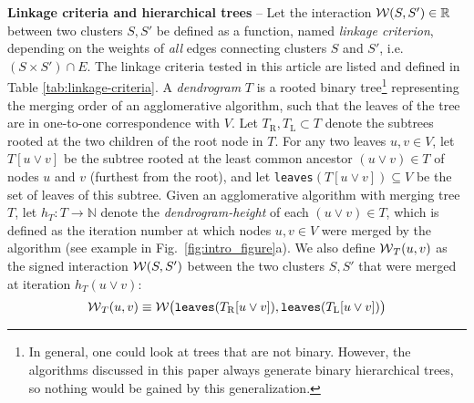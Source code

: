\textbf{Linkage criteria and hierarchical trees} -- 
Let the interaction $\mathcal{W}(S,S')\in\mathbb{R}$ between two clusters $S,S'$ be defined as a function, named \emph{linkage criterion}, depending on the weights of \emph{all} edges connecting clusters $S$ and $S'$, i.e. ${(S \times S') \cap E}$. 
The linkage criteria tested in this article are listed and defined in Table \ref{tab:linkage-criteria}.
A \emph{dendrogram} $T$ is a rooted binary tree\footnote{In general, one could look at trees that are not binary. However, the algorithms discussed in this paper always generate binary hierarchical trees, so nothing would be gained by this generalization.} representing the merging order of an agglomerative algorithm, such that the leaves of the tree are in one-to-one correspondence with $V$. 
Let $T_{\mathrm{R}},T_{\mathrm{L}}\subset T$ denote the subtrees rooted at the two children of the root node in $T$.
For any two leaves $u,v \in V$, let $T[u \vee v]$ be the subtree rooted at the least common ancestor $(u \vee v)\in T$ of nodes $u$ and $v$ (furthest from the root), and let \texttt{leaves}$(T[u \vee v])\subseteq V$ be the set of leaves of this subtree. 
Given an agglomerative algorithm with merging tree $T$, let $h_T:T \rightarrow \mathbb{N}$ denote the \emph{dendrogram-height} of each $(u\vee v)\in T$, which is defined as the iteration number at which nodes $u,v\in V$ were merged by the algorithm (see example in Fig.~\ref{fig:intro_figure}a). We also define $\mathcal{W}{}_{T}(u,v)$ as the signed interaction $\mathcal{W}{}(S,S')$ between the two clusters $S,S'$ that were merged at iteration $h_T(u\vee v)$: 
\begin{equation}\label{eq:def_dendr_interact}
\mathcal{W}{}_{T}(u,v) \equiv \mathcal{W}{} \big( \text{\texttt{leaves}}(T_{\mathrm{R}}[u \vee v]), \text{\texttt{leaves}}(T_{\mathrm{L}}[u \vee v]) \big)
\end{equation}




